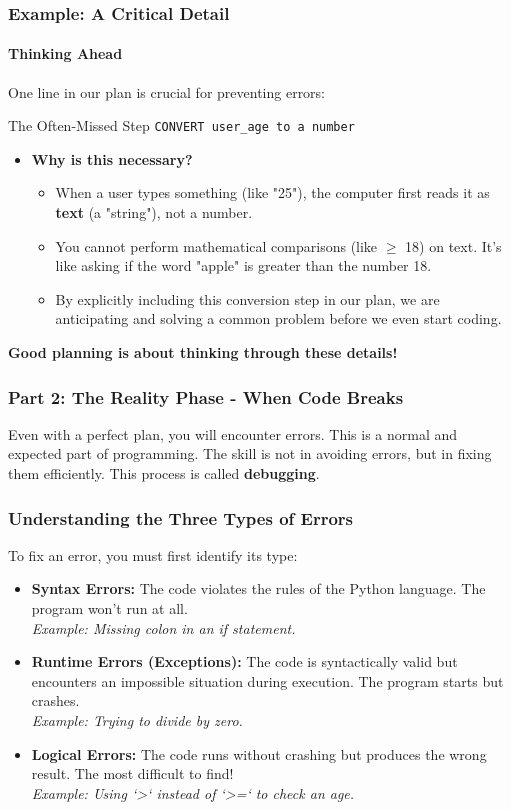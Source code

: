 \documentclass{beamer}
\begin{document}
\begin{frame}[fragile]
    \frametitle{Example: A Critical Detail}
    \framesubtitle{Thinking Ahead}

    One line in our plan is crucial for preventing errors:

    \begin{block}{The Often-Missed Step}
        \texttt{CONVERT user\_age to a number}
    \end{block}

    \begin{itemize}
        \item \textbf{Why is this necessary?}
        \begin{itemize}
            \item When a user types something (like "25"), the computer first reads it as \textbf{text} (a "string"), not a number.
            \item You cannot perform mathematical comparisons (like $\geq$ 18) on text. It's like asking if the word "apple" is greater than the number 18.
            \item By explicitly including this conversion step in our plan, we are anticipating and solving a common problem before we even start coding.
        \end{itemize}
    \end{itemize}
    \vspace{1em}
    \centering
    \textbf{Good planning is about thinking through these details!}
\end{frame}

\begin{frame}[fragile]
                \frametitle{Part 2: The Reality Phase - When Code Breaks}
                Even with a perfect plan, you will encounter errors. This is a normal and expected part of programming. The skill is not in avoiding errors, but in fixing them efficiently. This process is called \textbf{debugging}.
            \end{frame}

\begin{frame}[fragile]
                \frametitle{Understanding the Three Types of Errors}
                To fix an error, you must first identify its type: \\ \begin{itemize} \item \textbf{Syntax Errors:} The code violates the rules of the Python language. The program won't run at all. \\ \textit{Example: Missing colon in an if statement.} \item \textbf{Runtime Errors (Exceptions):} The code is syntactically valid but encounters an impossible situation during execution. The program starts but crashes. \\ \textit{Example: Trying to divide by zero.} \item \textbf{Logical Errors:} The code runs without crashing but produces the wrong result. The most difficult to find! \\ \textit{Example: Using `>` instead of `>=` to check an age.} \end{itemize}
            \end{frame}
\end{document}
